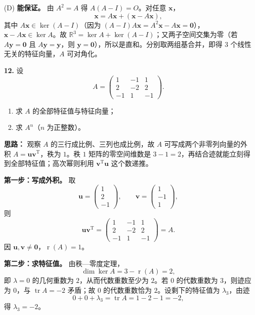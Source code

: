 (D) \textbf{能保证。} 由 \(A^2=A\) 得 \(A(A-I)=O\)。对任意 \(\mathbf{x}\)，
\[
\mathbf{x}=A\mathbf{x}+(\mathbf{x}-A\mathbf{x}),
\]
其中 \(A\mathbf{x}\in\ker(A-I)\)（因为 \((A-I)A\mathbf{x}=A^2\mathbf{x}-A\mathbf{x}=\mathbf{0}\)），\(\mathbf{x}-A\mathbf{x}\in\ker A\)。故 \(\mathbb{R}^3=\ker A+\ker(A-I)\)；又两子空间交集为零（若 \(A\mathbf{y}=\mathbf{0}\) 且 \(A\mathbf{y}=\mathbf{y}\)，则 \(\mathbf{y}=\mathbf{0}\)），所以是直和。分别取两组基合并，即得 \(3\) 个线性无关的特征向量，\(A\) 可对角化。

\else \answerarea[8] \fi%

\textbf{12.} 设
\[
A=\begin{pmatrix}1&-1&1\\2&-2&2\\-1&1&-1\end{pmatrix}.
\]
\begin{enumerate}[label=(\Roman*)]
  \item 求 \(A\) 的全部特征值与特征向量；
  \item 求 \(A^n\)（\(n\) 为正整数）。
\end{enumerate}

\ifshowsolutions%
\textbf{思路：} 观察 \(A\) 的三行成比例、三列也成比例，故 \(A\) 可写成两个非零列向量的外积 \(A=\mathbf{u}\mathbf{v}^{\mathrm{T}}\)，秩为 \(1\)。秩 \(1\) 矩阵的零空间维数是 \(3-1=2\)，再结合迹就能立刻得到全部特征值；高次幂则利用 \(\mathbf{v}^{\mathrm{T}}\mathbf{u}\) 这个数递推。

\textbf{第一步：写成外积。} 取
\[
\mathbf{u}=\begin{pmatrix}1\\2\\-1\end{pmatrix},\qquad
\mathbf{v}=\begin{pmatrix}1\\-1\\1\end{pmatrix},
\]
则
\[
\mathbf{u}\mathbf{v}^{\mathrm{T}}=
\begin{pmatrix}1&-1&1\\2&-2&2\\-1&1&-1\end{pmatrix}=A.
\]
因 \(\mathbf{u},\mathbf{v}\neq\mathbf{0}\)，\(\operatorname{r}(A)=1\)。

\textbf{第二步：求特征值。} 由秩—零度定理，
\[
\dim\ker A=3-\operatorname{r}(A)=2,
\]
即 \(\lambda=0\) 的几何重数为 \(2\)，从而代数重数至少为 \(2\)。若 \(0\) 的代数重数为 \(3\)，则迹应为 \(0\)，与 \(\operatorname{tr}A=-2\) 矛盾；故 \(0\) 的代数重数恰为 \(2\)。设剩下的特征值为 \(\lambda_3\)，由迹
\[
0+0+\lambda_3=\operatorname{tr}A=1-2-1=-2,
\]
得 \(\lambda_3=-2\)。

